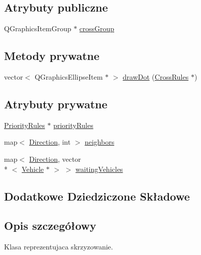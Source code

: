 \subsection*{Atrybuty publiczne}
\begin{DoxyCompactItemize}
\item 
Q\-Graphics\-Item\-Group $\ast$ \hyperlink{class_cross_a62b3a18fc6fa317d516846efe454b8ae}{cross\-Group}
\end{DoxyCompactItemize}
\subsection*{Metody prywatne}
\begin{DoxyCompactItemize}
\item 
vector$<$ Q\-Graphics\-Ellipse\-Item $\ast$ $>$ \hyperlink{class_cross_acc4e85c6307c933995275b7c84916ca9}{draw\-Dot} (\hyperlink{class_cross_rules}{Cross\-Rules} $\ast$)
\end{DoxyCompactItemize}
\subsection*{Atrybuty prywatne}
\begin{DoxyCompactItemize}
\item 
\hyperlink{class_priority_rules}{Priority\-Rules} $\ast$ \hyperlink{class_cross_a46a8edfbb4172a050ceeba58db6c30bb}{priority\-Rules}
\item 
map$<$ \hyperlink{_direction_8h_a224b9163917ac32fc95a60d8c1eec3aa}{Direction}, int $>$ \hyperlink{class_cross_af931388763664ba4224f054b6a42fea2}{neighbors}
\item 
map$<$ \hyperlink{_direction_8h_a224b9163917ac32fc95a60d8c1eec3aa}{Direction}, vector\\*
$<$ \hyperlink{class_vehicle}{Vehicle} $\ast$ $>$ $>$ \hyperlink{class_cross_aa6994973a6c8e4d0478410dbeb47d3b4}{waiting\-Vehicles}
\end{DoxyCompactItemize}
\subsection*{Dodatkowe Dziedziczone Składowe}


\subsection{Opis szczegółowy}
Klasa reprezentujaca skrzyzowanie. 

